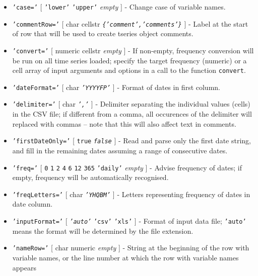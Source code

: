  \begin{itemize}
 \item
   \texttt{'case='} {[} \texttt{'lower'} \textbar{} \texttt{'upper'}
   \textbar{} \emph{empty} {]} - Change case of variable names.
 \item
   \texttt{'commentRow='} {[} char \textbar{} cellstr \textbar{}
   \emph{\texttt{\{'comment','comments'\}}} {]} - Label at the start of
   row that will be used to create tseries object comments.
 \item
   \texttt{'convert='} {[} numeric \textbar{} cellstr \textbar{}
   \emph{empty} {]} - If non-empty, frequency conversion will be run on
   all time series loaded; specify the target frequency (numeric) or a
   cell array of input arguments and options in a call to the function
   \texttt{convert}.
 \item
   \texttt{'dateFormat='} {[} char \textbar{} \emph{\texttt{'YYYYFP'}}
   {]} - Format of dates in first column.
 \item
   \texttt{'delimiter='} {[} char \textbar{} \emph{\texttt{','}} {]} -
   Delimiter separating the individual values (cells) in the CSV file; if
   different from a comma, all occurences of the delimiter will replaced
   with commas -- note that this will also affect text in comments.
 \item
   \texttt{'firstDateOnly='} {[} \texttt{true} \textbar{}
   \emph{\texttt{false}} {]} - Read and parse only the first date string,
   and fill in the remaining dates assuming a range of consecutive dates.
 \item
   \texttt{'freq='} {[} \texttt{0} \textbar{} \texttt{1} \textbar{}
   \texttt{2} \textbar{} \texttt{4} \textbar{} \texttt{6} \textbar{}
   \texttt{12} \textbar{} \texttt{365} \textbar{} \texttt{'daily'}
   \textbar{} \emph{empty} {]} - Advise frequency of dates; if empty,
   frequency will be automatically recognised.
 \item
   \texttt{'freqLetters='} {[} char \textbar{} \emph{\texttt{'YHQBM'}}
   {]} - Letters representing frequency of dates in date column.
 \item
   \texttt{'inputFormat='} {[} \emph{\texttt{'auto'}} \textbar{}
   \texttt{'csv'} \textbar{} \texttt{'xls'} {]} - Format of input data
   file; \texttt{'auto'} means the format will be determined by the file
   extension.
 \item
   \texttt{'nameRow='} {[} char \textbar{} numeric \textbar{}
   \emph{empty} {]} - String at the beginning of the row with variable
   names, or the line number at which the row with variable names appears

\end{itemize}

